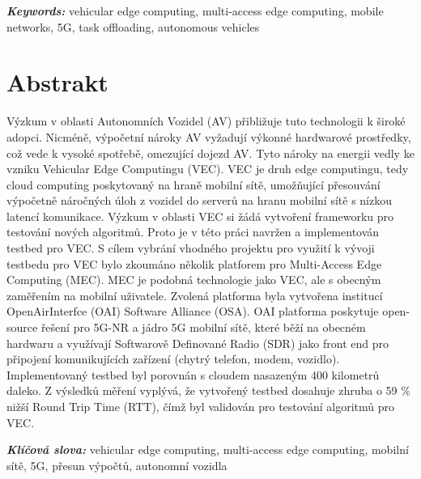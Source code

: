 \documentclass[12pt,a4paper,twoside]{report}
\providecommand{\keywords}[1]{\vspace{4pt}\textbf{\textit{Keywords: }} #1}
\providecommand{\keywordscz}[1]{\vspace{4pt}\textbf{\textit{Klíčová slova: }} #1}
\begin{document}
\keywords{vehicular edge computing, multi-access edge computing, mobile networks, 5G, task offloading, autonomous vehicles}
%
%
\newpage

\chapter*{Abstrakt}
Výzkum v oblasti Autonomních Vozidel (AV) přibližuje tuto technologii k široké adopci. Nicméně, výpočetní nároky AV vyžadují výkonné hardwarové prostředky, což vede k vysoké spotřebě, omezující dojezd AV. Tyto nároky na energii vedly ke vzniku Vehicular Edge Computingu (VEC). VEC je druh edge computingu, tedy cloud computing poskytovaný na hraně mobilní sítě, umožňující přesouvání výpočetně náročných úloh z vozidel do serverů na hranu mobilní sítě s nízkou latencí komunikace. Výzkum v oblasti VEC si žádá vytvoření frameworku pro testování nových algoritmů. Proto je v této práci navržen a implementován testbed pro VEC. S cílem vybrání vhodného projektu pro využití k vývoji testbedu pro VEC bylo zkoumáno několik platforem pro Multi-Access Edge Computing (MEC). MEC je podobná technologie jako VEC, ale s obecným zaměřením na mobilní uživatele. Zvolená platforma byla vytvořena institucí OpenAirInterfce (OAI) Software Alliance (OSA). OAI platforma poskytuje open-source řešení pro 5G-NR a jádro 5G mobilní sítě, které běží na obecném hardwaru a využívají Softwarově Definované Radio (SDR) jako front end pro připojení komunikujících zařízení (chytrý telefon, modem, vozidlo). Implementovaný testbed byl porovnán s cloudem nasazeným 400 kilometrů daleko. Z výsledků měření vyplývá, že vytvořený testbed dosahuje zhruba o 59 \% nižší Round Trip Time (RTT), čímž byl validován pro testování algoritmů pro VEC.

\keywordscz{vehicular edge computing, multi-access edge computing, mobilní sítě, 5G, přesun výpočtů, autonomn\'i vozidla}
%
%
\newpage

\tableofcontents			

\glsaddallunused
\printglossary[type=\acronymtype,title={List of Abbreviations}]	%



\newpage
\end{document}
